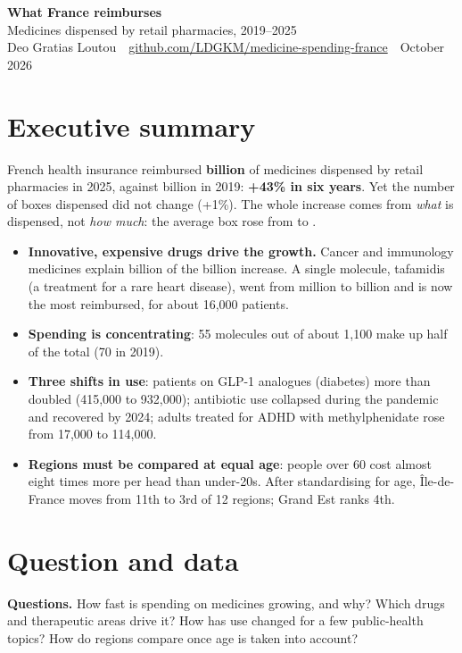 \documentclass[11pt,a4paper]{article}
\begin{document}
\begin{center}
{\LARGE\bfseries\color{accent} What France reimburses}\\[4pt]
{\large Medicines dispensed by retail pharmacies, 2019--2025}\\[8pt]
Deo Gratias Loutou \,\textbar\, \href{https://github.com/LDGKM/medicine-spending-france}{github.com/LDGKM/medicine-spending-france} \,\textbar\, October 2026
\end{center}

\section*{Executive summary}
French health insurance reimbursed \textbf{ billion} of medicines dispensed by retail pharmacies in
2025, against  billion in 2019: \textbf{+43\% in six years}. Yet the number of boxes dispensed did not
change (+1\%). The whole increase comes from \emph{what} is dispensed, not \emph{how much}: the average box rose from
 to .
\begin{itemize}
  \item \textbf{Innovative, expensive drugs drive the growth.} Cancer and immunology medicines explain 
        billion of the  billion increase. A single molecule, tafamidis (a treatment for a rare heart
        disease), went from  million to  billion and is now the most reimbursed, for about
        16{,}000 patients.
  \item \textbf{Spending is concentrating}: 55 molecules out of about 1{,}100 make up half of the total (70 in 2019).
  \item \textbf{Three shifts in use}: patients on GLP-1 analogues (diabetes) more than doubled (415{,}000 to 932{,}000);
        antibiotic use collapsed during the pandemic and recovered by 2024; adults treated for ADHD with methylphenidate
        rose from 17{,}000 to 114{,}000.
  \item \textbf{Regions must be compared at equal age}: people over 60 cost almost eight times more per head than under-20s. After
        standardising for age, Île-de-France moves from 11th to 3rd of 12 regions; Grand Est ranks 4th.
\end{itemize}

\section{Question and data}
\textbf{Questions.} How fast is spending on medicines growing, and why? Which drugs and therapeutic areas drive it?
How has use changed for a few public-health topics? How do regions compare once age is taken into account?
\end{document}
